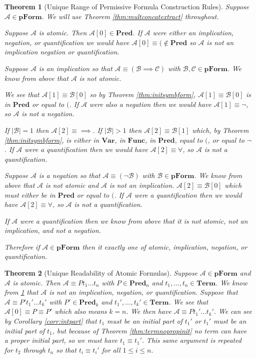\documentclass[12pt]{article}
\theoremstyle{break}
\theoremstyle{break}
\newtheorem{theorem}{Theorem}[section]
\theoremstyle{break}
\theoremstyle{break}
\newcommand{\mc}[1]{\mathcal{#1}}
\begin{document}
\begin{theorem}[Unique Range of Permissive Formula Construction Rules]
\label{thm:uniquerange}
Suppose $\mc{A}\in\textbf{pForm}$.
We will use Theorem \ref{thm:multconcatextract} throughout.

Suppose $\mc{A}$ is atomic.
Then $\mc{A}[0] \in \textbf{Pred}$.
If $\mc{A}$ were either an implication, negation, or quantification we would have $\mc{A}[0]\equiv (\not\in \textbf{Pred}$ so $\mc{A}$ is not an implication negation or quantification.



Suppose $\mc{A}$ is an implication so that $\mc{A} \equiv (\mc{B}\implies \mc{C})$ with $\mc{B},\mc{C}\in\textbf{pForm}$.
We know from above that $\mc{A}$ is not atomic.

We see that $\mc{A}[1]\equiv \mc{B}[0]$ so by Theorem \ref{thm:initsymbform}, $\mc{A}[1]\equiv\mc{B}[0]$ is in $\textbf{Pred}$ or equal to $($. 
If $\mc{A}$ were also a negation then we would have $\mc{A}[1]\equiv \lnot$, so $\mc{A}$ is not a negation.

If $|\mc{B}| = 1$ then $\mc{A}[2]\equiv \implies$.
If $|\mc{B}| > 1$ then $\mc{A}[2] \equiv \mc{B}[1]$ which, by Theorem \ref{thm:initsymbform}, is either in $\textbf{Var}$, in $\textbf{Func}$, in $\textbf{Pred}$, equal to $($, or equal to $\lnot$. 
If $\mc{A}$ were a quantification then we would have $\mc{A}[2] \equiv \forall$, so $\mc{A}$ is not a quantification.

Suppose $\mc{A}$ is a negation so that $\mc{A} \equiv (\lnot \mc{B})$ with $\mc{B}\in\textbf{pForm}$.
We know from above that $\mc{A}$ is not atomic and $\mc{A}$ is not an implication.
$\mc{A}[2] \equiv \mc{B}[0]$ which must either be in $\textbf{Pred}$ or equal to $($.
If $\mc{A}$ were a quantification then we would have $\mc{A}[2] \equiv \forall$, so $\mc{A}$ is not a quantification.

If $\mc{A}$ were a quantification then we know from above that it is not atomic, not an implication, and not a negation.

Therefore if $\mc{A}\in\textbf{pForm}$ then it exactly one of atomic, implication, negation, or quantification.
\end{theorem}

\begin{theorem}[Unique Readability of Atomic Formulas]
\label{thm:atomunique}
Suppose $\mc{A}\in \textbf{pForm}$ and $\mc{A}$ is atomic.
Then $\mc{A} \equiv Pt_1\ldots t_n$ with $P\in\textbf{Pred}_n$ and $t_1,\ldots,t_n\in\textbf{Term}$. 
We know from \ref{thm:uniquerange} that $\mc{A}$ is not an implication, negation, or quantification.
Suppose that $\mc{A} \equiv P't_1'\ldots t_k'$ with $P'\in\textbf{Pred}_k$ and $t_1',\ldots, t_k'\in\textbf{Term}$.
We see that $\mc{A}[0] \equiv P \equiv P'$ which also means $k=n$.
We then have $\mc{A}\equiv P t_1'\ldots t_k'$.
We can see by Corollary \ref{corr:intpart} that $t_1$ must be an initial part of $t_1'$ or $t_1'$ must be an initial part of $t_1$, but because of Theorem \ref{thm:termnopropinit} no term can have a proper initial part, so we must have $t_1\equiv t_1'$.
This same argument is repeated for $t_2$ through $t_n$ so that $t_i \equiv t_i'$ for all $1 \le i \le n$.
\end{theorem}
\end{document}
